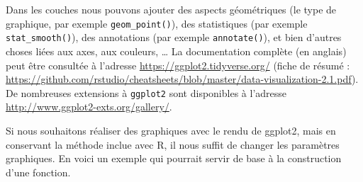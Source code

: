 \documentclass[twoside,symmetric]{book}
\begin{document}
Dans les couches nous pouvons ajouter des aspects géométriques (le type de graphique, par exemple \texttt{geom\_point()}), des statistiques (par exemple \texttt{stat\_smooth()}), des annotations (par exemple \texttt{annotate()}), et bien d'autres choses liées aux axes, aux couleurs, \ldots{} La documentation complète (en anglais) peut être consultée à l'adresse \url{https://ggplot2.tidyverse.org/} (fiche de résumé : \url{https://github.com/rstudio/cheatsheets/blob/master/data-visualization-2.1.pdf}). De nombreuses extensions à \texttt{ggplot2} sont disponibles à l'adresse \url{http://www.ggplot2-exts.org/gallery/}.

Si nous souhaitons réaliser des graphiques avec le rendu de ggplot2, mais en conservant la méthode inclue avec R, il nous suffit de changer les paramètres graphiques. En voici un exemple qui pourrait servir de base à la construction d'une fonction.
\end{document}

